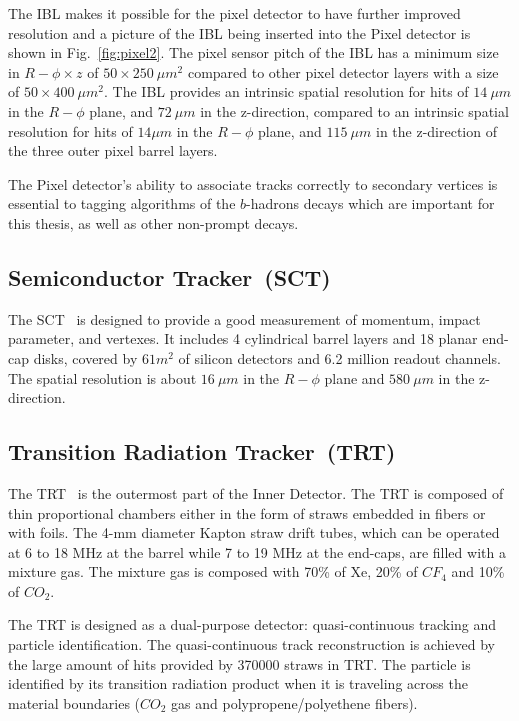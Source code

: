 \par The IBL makes it possible for the pixel detector to have further improved resolution and a picture of the IBL being inserted into the Pixel detector is shown in Fig.~\ref{fig:pixel2}. The pixel sensor pitch of the IBL has a minimum size in $R-\phi \times z$ of $50 \times 250~\mu m^2$ compared to other pixel detector layers with a size of $50 \times 400~\mu m^2$. The IBL provides an intrinsic spatial resolution for hits of $14~\mu m$ in the $R-\phi$ plane, and $72~\mu m$ in the z-direction, compared to an intrinsic spatial resolution for hits of $14\mu m$ in the $R-\phi$ plane, and $115~\mu m$ in the z-direction of the three outer pixel barrel layers.

\par The Pixel detector's ability to associate tracks correctly to secondary vertices is essential to tagging algorithms of the $b$-hadrons decays which are important for this thesis, as well as other non-prompt decays.

\subsection{Semiconductor Tracker~(SCT)}
\par The SCT~\cite{AHMAD200798} is designed to provide a good measurement of momentum, impact parameter, and vertexes. It includes 4 cylindrical barrel layers and 18 planar end-cap disks, covered by $61 m^2$ of silicon detectors and 6.2 million readout channels. The spatial resolution is about $16~\mu m$ in the $R-\phi$ plane and $580~\mu m$ in the z-direction.

\subsection{Transition Radiation Tracker~(TRT)}
\par The TRT~\cite{Abat:2008zza} is the outermost part of the Inner Detector. The TRT is composed of thin proportional chambers either in the form of straws embedded in fibers or with foils. The 4-mm diameter Kapton straw drift tubes, which can be operated at 6 to 18 MHz at the barrel while 7 to 19 MHz at the end-caps, are filled with a mixture gas. The mixture gas is composed with 70\% of Xe, 20\% of $CF_{4}$ and 10\% of $CO_{2}$.

\par The TRT is designed as a dual-purpose detector: quasi-continuous tracking and particle identification. The quasi-continuous track reconstruction is achieved by the large amount of hits provided by 370000 straws in TRT. The particle is identified by its transition radiation product when it is traveling across the material boundaries ($CO_{2}$ gas and polypropene/polyethene fibers). 

